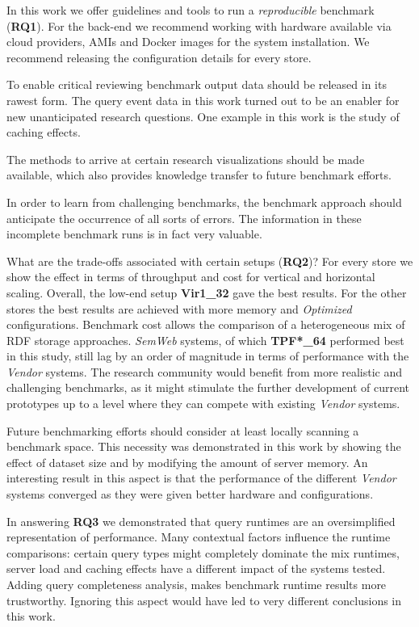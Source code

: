 In this work we offer guidelines and tools to run a \emph{reproducible} benchmark (\textbf{RQ1}). For the back-end we recommend working with hardware available via cloud providers, AMIs and Docker images for the system installation. We recommend releasing the configuration details for every store. 

To enable critical reviewing benchmark output data should be released in its rawest form. The  query event data in this work turned out to be an enabler for new unanticipated research questions. One example in this work is the study of caching effects. 

The methods to arrive at certain research visualizations should be made available, which also provides knowledge transfer to future benchmark efforts. 

In order to learn from challenging benchmarks, the benchmark approach should anticipate the occurrence of all sorts of errors. The information in these incomplete benchmark runs is in fact very valuable. 

What are the trade-offs associated with certain setups (\textbf{RQ2})? For every store we show the effect in terms of throughput and cost for vertical and horizontal scaling. 
Overall, the low-end setup \textbf{Vir1\_32} gave the best results. For the other stores the best results are achieved with more memory and \emph{Optimized} configurations.
Benchmark cost allows the comparison of a heterogeneous mix of RDF storage approaches. \emph{SemWeb} systems, of which \textbf{TPF*\_64} performed best in this study, still lag by an order of magnitude in terms of performance with the \emph{Vendor} systems. The research community would benefit from more realistic and challenging benchmarks, as it might stimulate the further development of current prototypes up to a level where they can compete with existing \emph{Vendor} systems.

Future benchmarking efforts should consider at least locally scanning a benchmark space. This necessity was demonstrated in this work by showing the effect of dataset size and by modifying the amount of server memory. An interesting result in this aspect is that the performance of the different \emph{Vendor} systems converged as they were given better hardware and configurations.

In answering \textbf{RQ3} we demonstrated that query runtimes are an oversimplified representation of performance. Many contextual factors influence the runtime comparisons: certain query types might completely dominate the mix runtimes, server load and caching effects have a different impact of the systems tested. Adding query completeness analysis, makes benchmark runtime results more trustworthy. Ignoring this aspect would have led to very different conclusions in this work.

